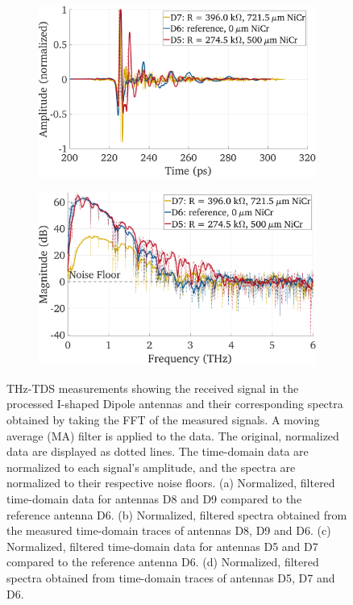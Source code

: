 \begin{figure}[!]
\begin{subfigure}[b]{0.49\textwidth}
        \caption{\centering}
        \label{comp_d6_d8_d9_spec}
    \end{subfigure}
    \hfill
    \begin{subfigure}[b]{0.49\textwidth}
        \centering
        \includegraphics[height=0.6\textwidth]{figures/Results/mainTextComp/D6_D5_D7/D6_D5_D7_MA_time_norm.pdf}
        \caption{\centering}
        \label{comp_d6_d5_d7_time}
    \end{subfigure}
    \hfill
    \begin{subfigure}[b]{0.49\textwidth}
        \centering
        \includegraphics[height=0.6\textwidth]{figures/Results/mainTextComp/D6_D5_D7/D6_D5_D7_spectrum.pdf}
        \caption{\centering}
        \label{comp_d6_d5_d7_spec}
    \end{subfigure}
    \caption{THz-TDS measurements showing the received signal in the processed I-shaped Dipole antennas and their corresponding spectra obtained by taking the FFT of the measured signals. A moving average (MA) filter is applied to the data. The original, normalized data are displayed as dotted lines. The time-domain data are normalized to each signal’s amplitude, and the spectra are normalized to their respective noise floors. (a) Normalized, filtered time-domain data for antennas D8 and D9 compared to the reference antenna D6. (b) Normalized, filtered spectra obtained from the measured time-domain traces of antennas D8, D9 and D6. (c) Normalized, filtered time-domain data for antennas D5 and D7 compared to the reference antenna D6. (d) Normalized, filtered spectra obtained from time-domain traces of antennas D5, D7 and D6.}
    \label{comp_I_dipoles}
\end{figure}

